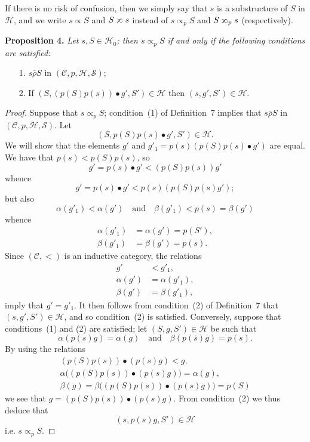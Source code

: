 \documentclass[fleqn]{article}
\newenvironment{itenv}[1]
  {\phantomsection\par\medskip\noindent\textbf{#1.}\itshape}
  {\par\medskip}
\newcommand{\oldpage}[1]{\marginpar{\footnotesize$\Big\vert$ \textit{p.~#1}}}
\newcommand{\CC}{\mathcal{C}}
\newcommand{\HH}{\mathcal{H}}
\renewcommand{\SS}{\mathcal{S}}
\newcommand{\relrhobar}{\mathrel{\bar{\rho}}}
\newcommand{\subs}{\mathrel{\propto}}
\newcommand{\sups}{\mathrel{\reflectbox{$\propto$}}}
\begin{document}
If there is no risk of confusion, then we simply say that $s$ is a substructure of $S$ in $\HH$, and we write $s\subs S$ and $S\sups s$ instead of $s\subs_p S$ and $S\sups_p s$ (respectively).

\begin{itenv}{Proposition 4}
  Let $s,S\in\HH_0$;
  then $s\subs_p S$ if and only if the following conditions are satisfied:
  \begin{enumerate}
    \item[1\textquotesingle.]
      $s\relrhobar S$ in $(\CC,p,\HH,\SS)$;
    \item[2\textquotesingle.]
      If $(S,(p(S)p(s))\bullet g',S')\in\HH$ then $(s,g',S')\in\HH$.
  \end{enumerate}
\end{itenv}

\begin{proof}
  Suppose that $s\subs_p S$;
  condition~(1) of Definition~7 implies that $s\relrhobar S$ in $(\CC,p,\HH,\SS)$.
  Let
  \[
    (S,p(S)p(s)\bullet g',S')\in\HH.
  \]
  We will show that the elements $g'$ and $g'_1=p(s)(p(S)p(s)\bullet g')$ are equal.
  We have that $p(s)<p(S)p(s)$, so
  \[
    g'
    = p(s)\bullet g'
    < (p(S)p(s))g'
  \]
  whence
  \[
    g'
    = p(s)\bullet g'
    < p(s)(p(S)p(s)g');
  \]
  \oldpage{361}
  but also
  \[
    \alpha(g'_1)<\alpha(g')
    \quad\text{and}\quad
    \beta(g'_1)<p(s)=\beta(g')
  \]
  whence
  \[
    \begin{aligned}
      \alpha(g'_1)
      &= \alpha(g')
      = p(S'),
    \\\beta(g'_1)
      &= \beta(g')
      = p(s).
    \end{aligned}
  \]
  Since $(\CC,<)$ is an inductive category, the relations
  \[
    \begin{aligned}
      g'
      &< g'_1,
    \\\alpha(g')
      &= \alpha(g'_1),
    \\\beta(g')
      &= \beta(g'_1),
    \end{aligned}
  \]
  imply that $g'=g'_1$.
  It then follows from condition~(2) of Definition~7 that $(s,g',S')\in\HH$, and so condition~(2\textquotesingle) is satisfied.
  Conversely, suppose that conditions~(1\textquotesingle) and (2\textquotesingle) are satisfied;
  let $(S,g,S')\in\HH$ be such that
  \[
    \alpha(p(s)g)=\alpha(g)
    \quad\text{and}\quad
    \beta(p(s)g)=p(s).
  \]
  By using the relations
  \[
    \begin{gathered}
      (p(S)p(s))\bullet(p(s)g)<g,
    \\\alpha\big((p(S)p(s))\bullet(p(s)g)\big)=\alpha(g),
    \\\beta(g)=\beta\big((p(S)p(s))\bullet(p(s)g)\big)=p(S)
    \end{gathered}
  \]
  we see that $g=(p(S)p(s))\bullet(p(s)g)$.
  From condition~(2\textquotesingle) we thus deduce that
  \[
    (s,p(s)g,S')\in\HH
  \]
  i.e. $s\subs_p S$.
\end{proof}
\end{document}
